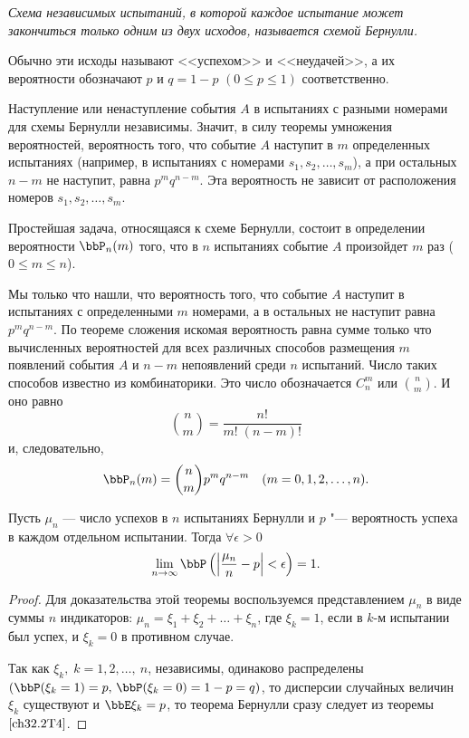 \textit{Схема независимых испытаний, в которой каждое испытание может закончиться только одним из двух исходов, называется схемой Бернулли.}

Обычно эти исходы называют <<успехом>> и <<неудачей>>, а их вероятности обозначают $p$ и $q = 1 - p$ $(0 \le p \le 1)$ соответственно.

Наступление или ненаступление события $A$ в испытаниях с разными номерами для схемы Бернулли независимы. Значит, в силу теоремы умножения вероятностей, вероятность того, что событие $A$ наступит в $m$ определенных испытаниях (например, в испытаниях с номерами $s_1, s_2, \ldots, s_m$), а при остальных $n - m$ не наступит, равна $p^mq^{n - m}$. Эта вероятность не зависит от  расположения номеров $s_1, s_2, \ldots, s_m$.

Простейшая задача, относящаяся к схеме Бернулли, состоит в определении вероятности $\bbP_n(m)$ того, что в $n$ испытаниях событие $A$ произойдет $m$ раз ($0 \le m \le n$).

Мы только что нашли, что вероятность того, что событие $A$ наступит в испытаниях с определенными $m$ номерами, а в остальных не наступит равна $p^mq^{n - m}$. По теореме сложения искомая вероятность равна сумме только что вычисленных вероятностей для всех различных способов размещения $m$ появлений события $A$ и $n - m$ непоявлений среди $n$ испытаний. Число таких способов известно из комбинаторики. Это число обозначается  $C_n^m$ или $\binom n m $. И оно равно	
$$
\binom n m = \frac{n!}{m!\;(n - m)!}
$$
и, следовательно,
\begin{equation} \label{ch32.1.1eq1}
\bbP_n(m) = \binom n m p^mq^{n - m} \quad (m = 0,1,2,\ldots,n).
\end{equation}

\begin{thm} 
Пусть $\mu_n$ --- число успехов в $n$ испытаниях Бернулли и $p$ "--- вероятность успеха в каждом отдельном испытании. Тогда $\forall \epsilon > 0$
\begin{equation} \label{ch32.2eq7}
\lim_{n \to \infty} \bbP \left( \left| \frac{\mu_n}{n} - p \right| < \epsilon \right) = 1.
\end{equation}
\end{thm}

\begin{proof}
Для доказательства этой теоремы воспользуемся представлением $\mu_n$ в виде суммы $n$ индикаторов: $\mu_n = \xi_1 + \xi_2 + \ldots + \xi_n$, где $\xi_k = 1$, если в $k$-м испытании был успех, и $\xi_k  = 0$ в противном случае.

Так как $\xi_k,\; k = 1,2,\ldots, \: n$, независимы, одинаково распределены $(\bbP( \xi_k = 1) = p, \,\bbP( \xi_k = 0) = 1 - p = q)$, то дисперсии случайных величин $\xi_k$ существуют и $\bbE  \xi_k = p$, то теорема Бернулли сразу следует из теоремы $\ref{ch32.2T4}$.
\end{proof}

